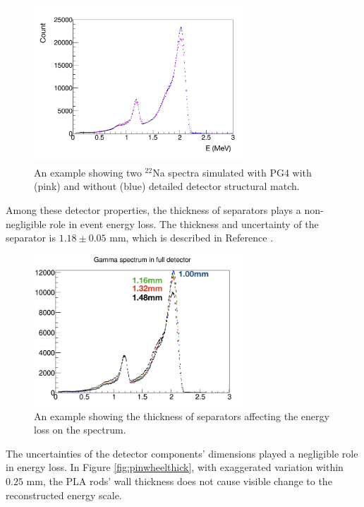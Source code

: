 \begin{figure}[h!]
\centering
\includegraphics[width=0.7\textwidth]{Figures/Na22PG4Adjusted.pdf}
\caption[The affect of different detector parameters]{An example showing two $^{22}$Na spectra simulated with PG4 with (pink) and without (blue) detailed detector structural match.}
\label{fig:PG4geometry}
\end{figure}

Among these detector properties, the thickness of separators plays a non-negligible role in event energy loss. 
The thickness and uncertainty of the separator is $1.18 \pm 0.05$ mm, which is described in Reference \cite{bib:prospect_og}.

\begin{figure}[h!]
\centering
\includegraphics[width=0.7\textwidth]{Figures/thickness.png}
\caption[The affect of separator thickness to energy scale]{An example showing the thickness of separators affecting the energy loss on the spectrum.}
\label{fig:thickness}
\end{figure}

The uncertainties of the detector components' dimensions played a negligible role in energy loss. 
In Figure \ref{fig:pinwheelthick}, with exaggerated variation within $0.25$ mm, the PLA rods' wall thickness does not cause visible change to the reconstructed energy scale.

